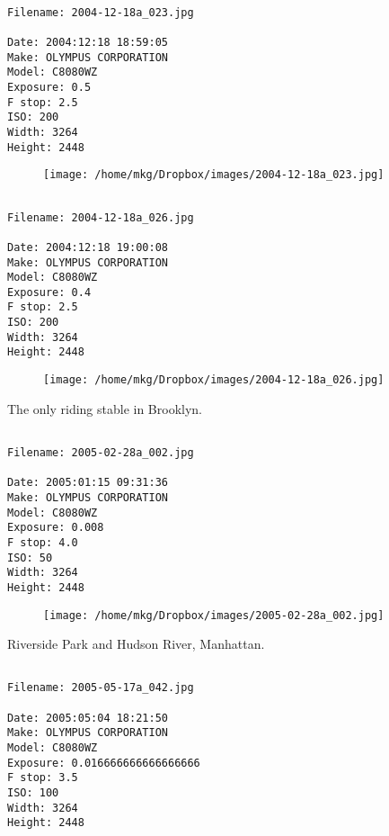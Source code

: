 \clearpage
\onecolumn
\noindent 
\noindent
\begin{lstlisting}

Filename: 2004-12-18a_023.jpg

Date: 2004:12:18 18:59:05
Make: OLYMPUS CORPORATION
Model: C8080WZ
Exposure: 0.5
F stop: 2.5
ISO: 200
Width: 3264
Height: 2448
\end{lstlisting}
\clearpage

\begin{figure}
\texttt{[image: /home/mkg/Dropbox/images/2004-12-18a\_023.jpg]}
\end{figure}
    
\clearpage
\onecolumn
\noindent 
\noindent
\begin{lstlisting}

Filename: 2004-12-18a_026.jpg

Date: 2004:12:18 19:00:08
Make: OLYMPUS CORPORATION
Model: C8080WZ
Exposure: 0.4
F stop: 2.5
ISO: 200
Width: 3264
Height: 2448
\end{lstlisting}
\clearpage

\begin{figure}
\texttt{[image: /home/mkg/Dropbox/images/2004-12-18a\_026.jpg]}
\end{figure}
    
\clearpage
\onecolumn
\noindent The only riding stable in Brooklyn.
\noindent
\begin{lstlisting}

Filename: 2005-02-28a_002.jpg

Date: 2005:01:15 09:31:36
Make: OLYMPUS CORPORATION
Model: C8080WZ
Exposure: 0.008
F stop: 4.0
ISO: 50
Width: 3264
Height: 2448
\end{lstlisting}
\clearpage

\begin{figure}
\texttt{[image: /home/mkg/Dropbox/images/2005-02-28a\_002.jpg]}
\end{figure}
    
\clearpage
\onecolumn
\noindent Riverside Park and Hudson River, Manhattan.
\noindent
\begin{lstlisting}

Filename: 2005-05-17a_042.jpg

Date: 2005:05:04 18:21:50
Make: OLYMPUS CORPORATION
Model: C8080WZ
Exposure: 0.016666666666666666
F stop: 3.5
ISO: 100
Width: 3264
Height: 2448
\end{lstlisting}
\clearpage

